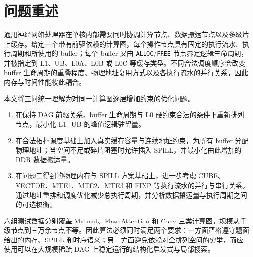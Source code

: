 \section{问题重述}

通用神经网络处理器在单核内部需要同时协调计算节点、数据搬运节点以及多级片上缓存。给定一个带有前驱依赖的计算图，每个操作节点具有固定的执行流水、执行周期和所使用的 buffer；每个 buffer 又由 \texttt{ALLOC}/\texttt{FREE} 节点界定逻辑生命周期，并被指定到 L1、UB、L0A、L0B 或 L0C 等缓存类型。不同合法调度顺序会改变 buffer 生命周期的重叠程度、物理地址复用方式以及各执行流水的并行关系，因此内存与时间性能彼此耦合。

本文将三问统一理解为对同一计算图逐层增加约束的优化问题。

\begin{enumerate}[label=\textbf{问题\arabic*:},leftmargin=5.5em]
    \item 在保持 DAG 前驱关系、buffer 生命周期与 L0 硬约束合法的条件下重新排列节点，最小化 L1+UB 的峰值逻辑驻留量。
    \item 在合法拓扑调度基础上加入真实缓存容量与连续地址约束，为所有 buffer 分配物理地址；当空间不足或碎片阻塞时允许插入 SPILL，并最小化由此增加的 DDR 数据搬运量。
    \item 在问题二得到的物理内存与 SPILL 方案基础上，进一步考虑 CUBE、VECTOR、MTE1、MTE2、MTE3 和 FIXP 等执行流水的并行与串行关系。通过地址重排和调度优化减少总执行周期，并分析数据搬运量与执行周期之间的可选权衡。
\end{enumerate}

六组测试数据分别覆盖 Matmul、FlashAttention 和 Conv 三类计算图，规模从千级节点到三万余节点不等。因此算法必须同时满足两个要求：一方面严格遵守题面给出的内存、SPILL 和时序语义；另一方面避免依赖对全排列空间的穷举，而应使用可以在大规模稀疏 DAG 上稳定运行的结构化启发式与局部搜索。